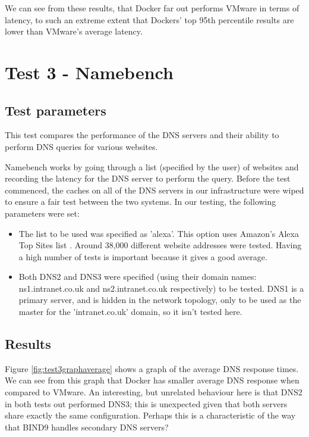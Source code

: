 We can see from these results, that Docker far out performs VMware in terms of latency, to such an extreme extent that Dockers' top 95th percentile results are lower than VMware's average latency.

\section{Test 3 - Namebench}
\subsection{Test parameters}
This test compares the performance of the DNS servers and their ability to perform DNS queries for various websites.

Namebench works by going through a list (specified by the user) of websites and recording the latency for the DNS server to perform the query\citep{Namebench}. Before the test commenced, the caches on all of the DNS servers in our infrastructure were wiped to ensure a fair test between the two systems. In our testing, the following parameters were set:
\begin{itemize}
  \item The list to be used was specified as 'alexa'. This option uses Amazon's Alexa Top Sites list \citep{alexainternet}. Around 38,000 different website addresses were tested. Having a high number of tests is important because it gives a good average.
  \item Both DNS2 and DNS3 were specified (using their domain names: ns1.intranet.co.uk and ns2.intranet.co.uk respectively) to be tested. DNS1 is a primary server, and is hidden in the network topology, only to be used as the master for the 'intranet.co.uk' domain, so it isn't tested here.
\end{itemize}

\subsection{Results}
Figure \ref{fig:test3graphaverage} shows a graph of the average DNS response times. We can see from this graph that Docker has smaller average DNS response when compared to VMware. An interesting, but unrelated behaviour here is that DNS2 in both tests out performed DNS3; this is unexpected given that both servers share exactly the same configuration. Perhaps this is a characteristic of the way that BIND9 handles secondary DNS servers?

